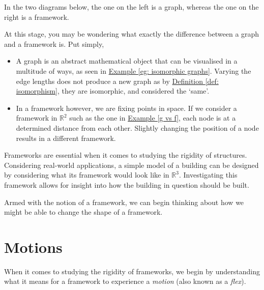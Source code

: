 \begin{example}
\label{g vs f}
In the two diagrams below, the one on the left is a graph, whereas the one on the right is a framework.
    \begin{figure}[h]
        \centering
        
    \end{figure}
\end{example}
\vspace{-8 mm}
\begin{flushleft}
At this stage, you may be wondering what exactly the difference between a graph and a framework is. Put simply,
\begin{itemize}
    \item A graph is an abstract mathematical object that can be visualised in a multitude of ways, as seen in \hyperref[eg: isomorphic graphs]{Example \ref*{eg: isomorphic graphs}}. Varying the edge lengths does not produce a new graph as by \hyperref[def: isomorphism]{Definition \ref*{def: isomorphism}}, they are isomorphic, and considered the `same'.
    \vspace{-3mm}
    \item In a framework however, we are fixing points in space. If we consider a framework in $\mathbb{R}^2$ such as the one in \hyperref[g vs f]{Example \ref*{g vs f}}, each node is at a determined distance from each other. Slightly changing the position of a node results in a different framework.

\end{itemize}
\end{flushleft}

\begin{flushleft}
Frameworks are essential when it comes to studying the rigidity of structures. Considering real-world applications, a simple model of a building can be designed by considering what its framework would look like in $\mathbb{R}^3$. Investigating this framework allows for insight into how the building in question should be built.
\end{flushleft}

\noindent
Armed with the notion of a framework, we can begin thinking about how we might be able to change the shape of a framework. 

\section{Motions}

\begin{flushleft}
When it comes to studying the rigidity of frameworks, we begin by understanding what it means for a framework to experience a \textit{motion} (also known as a \textit{flex}). 
\end{flushleft}

